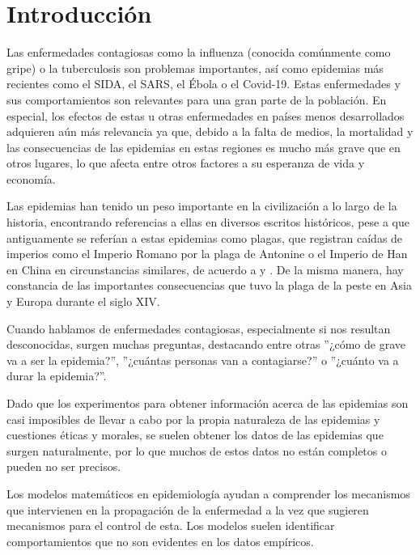 
\chapter*{Introducción}

Las enfermedades contagiosas como la influenza (conocida comúnmente como gripe) o la tuberculosis son problemas importantes, así como epidemias más recientes como el SIDA, el SARS, el Ébola o el Covid-19. Estas enfermedades y sus comportamientos son relevantes para una gran parte de la población. En especial, los efectos de estas u otras enfermedades en países menos desarrollados adquieren aún más relevancia ya que, debido a la falta de medios, la mortalidad y las consecuencias de las epidemias en estas regiones es mucho más grave que en otros lugares, lo que afecta entre otros factores a su esperanza de vida y economía.

Las epidemias han tenido un peso importante en la civilización a lo largo de la historia, encontrando referencias a ellas en diversos escritos históricos, pese a que antiguamente se referían a estas epidemias como plagas, que registran caídas de imperios como el Imperio Romano por la plaga de Antonine o el Imperio de Han en China en circunstancias similares, de acuerdo a \cite{Sommerfeld2003} y \cite{duncan-jones_1996}. De la misma manera, hay constancia de las importantes consecuencias que tuvo la plaga de la peste en Asia y Europa durante el siglo XIV.

Cuando hablamos de enfermedades contagiosas, especialmente si nos resultan desconocidas, surgen muchas preguntas, destacando entre otras ''¿cómo de grave va a ser la epidemia?'', ''¿cuántas personas van a contagiarse?'' o ''¿cuánto va a durar la epidemia?''.

Dado que los experimentos para obtener información acerca de las epidemias son casi imposibles de llevar a cabo por la propia naturaleza de las epidemias y cuestiones éticas y morales, se suelen obtener los datos de las epidemias que surgen naturalmente, por lo que muchos de estos datos no están completos o pueden no ser precisos.

Los modelos matemáticos en epidemiología ayudan a comprender los mecanismos que intervienen en la propagación de la enfermedad a la vez que sugieren mecanismos para el control de esta. Los modelos suelen identificar comportamientos que no son evidentes en los datos empíricos.


